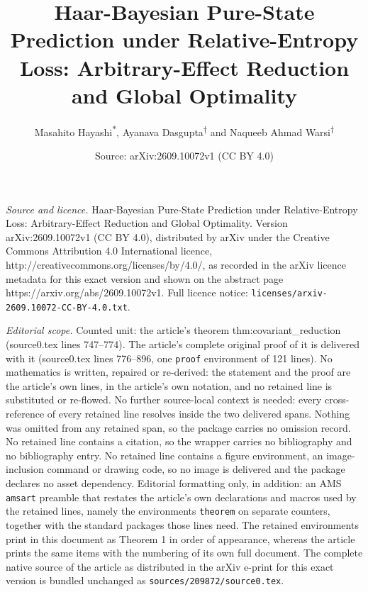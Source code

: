 \documentclass[10pt,a4paper]{amsart}
\title{Haar-Bayesian Pure-State Prediction under Relative-Entropy Loss: Arbitrary-Effect Reduction and Global Optimality}
\author{Masahito Hayashi\textsuperscript{$*$}, Ayanava Dasgupta\textsuperscript{$\dagger$} and Naqueeb Ahmad Warsi\textsuperscript{$\dagger$}}
\date{Source: arXiv:2609.10072v1 (CC BY 4.0)}
\begin{document}
\maketitle

\noindent\emph{Source and licence.} Haar-Bayesian Pure-State Prediction under Relative-Entropy Loss: Arbitrary-Effect Reduction and Global Optimality. Version arXiv:2609.10072v1 (CC BY 4.0), distributed by arXiv under the Creative Commons Attribution 4.0 International licence, http://creativecommons.org/licenses/by/4.0/, as recorded in the arXiv licence metadata for this exact version and shown on the abstract page https://arxiv.org/abs/2609.10072v1. Full licence notice: \texttt{licenses/arxiv-2609.10072-CC-BY-4.0.txt}.\par\smallskip

\noindent\textit{Editorial scope.} Counted unit: the article's theorem thm:covariant\_reduction (source0.tex lines 747--774). The article's complete original proof of it is delivered with it (source0.tex lines 776--896, one \texttt{proof} environment of 121 lines). No mathematics is written, repaired or re-derived: the statement and the proof are the article's own lines, in the article's own notation, and no retained line is substituted or re-flowed.  No further source-local context is needed: every cross-reference of every retained line resolves inside the two delivered spans.  Nothing was omitted from any retained span, so the package carries no omission record.  No retained line contains a citation, so the wrapper carries no bibliography and no bibliography entry.  No retained line contains a figure environment, an image-inclusion command or drawing code, so no image is delivered and the package declares no asset dependency.  Editorial formatting only, in addition: an AMS \texttt{amsart} preamble that restates the article's own declarations and macros used by the retained lines, namely the environments \texttt{theorem} on separate counters, together with the standard packages those lines need.  The retained environments print in this document as Theorem 1 in order of appearance, whereas the article prints the same items with the numbering of its own full document.  The complete native source of the article as distributed in the arXiv e-print for this exact version is bundled unchanged as \texttt{sources/209872/source0.tex}.
\end{document}
